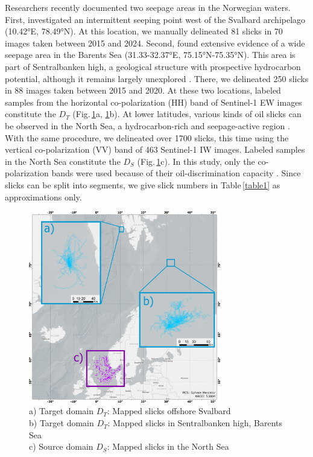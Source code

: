 \documentclass[lettersize,journal]{IEEEtran}
\begin{document}
Researchers recently documented two seepage areas in the Norwegian waters. 
First, \cite{panieriArcticNaturalOil2024} investigated an intermittent seeping point west of the Svalbard archipelago (10.42°E, 78.49°N). At this location, we manually delineated 81 slicks 
in 70 images taken between 2015 and 2024. Second, \cite{serovWidespreadNaturalMethane2023,ivanovSearchDetectionNatural2020} found extensive evidence of a wide seepage area in the Barents Sea (31.33-32.37°E, 75.15°N-75.35°N). 
This area is part of Sentralbanken high, a geological structure with prospective hydrocarbon potential, although it remains largely unexplored \cite{lundschienNorthBarentsComposite2025}. 
There, we delineated 250 slicks in 88 images taken between 2015 and 2020. At these two locations, labeled samples from the horizontal co-polarization (HH) band of Sentinel-1 EW images constitute the 
$\mathit{D}_T$ (Fig.\,\ref{figure1}a, \ref{figure1}b). At lower latitudes, various kinds of oil slicks can be observed in the North Sea, a hydrocarbon-rich and seepage-active region \cite{hovlandChapter2Focus1988}. 
With the same procedure, we delineated over 1700 slicks, this time using the vertical co-polarization (VV) band of 463 Sentinel-1 IW images. Labeled samples in the North Sea constitute the $\mathit{D}_S$ (Fig.\,\ref{figure1}c). 
In this study, only the co-polarization bands were used because of their oil-discrimination capacity \cite{kudryavtsevDualCoPolarizedSAR2013,johanssonMultifrequencyPolarimetricSAR2017,brekkeSAROilSpill2020}. 
Since slicks can be split into segments, we give slick numbers in Table\,\ref{table1} as approximations only.
\begin{figure}[!t]
    \centering
    \includegraphics[width=3.3in]{figures/layout2_grids.png} %
    \caption{a) Target domain \( \mathit{D}_T \): Mapped slicks offshore Svalbard \\ \quad b) Target domain \( \mathit{D}_T \): Mapped slicks in Sentralbanken high, Barents Sea \\ 
    \quad c) Source domain \( \mathit{D}_S \): Mapped slicks in the North Sea}
    \label{figure1}
\end{figure}
\end{document}
